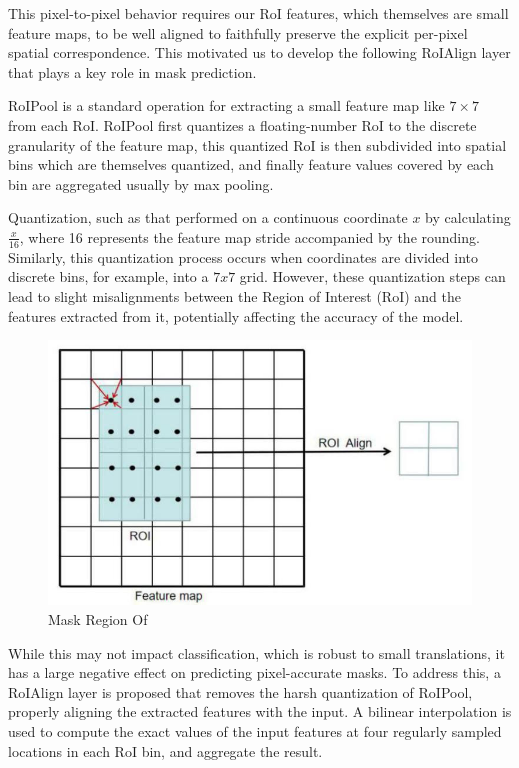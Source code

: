 This pixel-to-pixel behavior requires our RoI features, which themselves are small feature maps, to be well aligned to faithfully preserve the explicit 
per-pixel spatial correspondence. This motivated us to develop the following RoIAlign layer that plays a key role in mask prediction.

RoIPool is a standard operation for extracting a small feature map like \(7 \times 7\) from each RoI. RoIPool first quantizes a floating-number RoI to the 
discrete granularity of the feature map, this quantized RoI is then subdivided into spatial bins  which are themselves quantized, and finally feature 
values covered by each bin are aggregated usually by max pooling. 

Quantization, such as that performed on a continuous coordinate $x$ by calculating \(\frac{x}{16}\), where 16 represents the feature map stride accompanied
by the rounding. Similarly, this quantization process occurs when coordinates are divided into discrete bins, for example, into a $7x7$ grid. However, these 
quantization steps can lead to slight misalignments between the Region of Interest (RoI) and the features extracted from it, potentially affecting the accuracy 
of the model.

\begin{figure}[h!]
    \centering
    \includegraphics[scale=0.30]{Figures/mask-r-cnn-roi-align.png}
    \caption{Mask Region Of  \cite{mrcnn}}
    \label{fig:roi-align}
\end{figure}

While this may not impact classification, which is robust to small translations, it has a large negative effect on predicting pixel-accurate masks.
To address this, a RoIAlign layer is proposed that removes the harsh quantization of RoIPool, properly aligning the extracted features with the input. 
A bilinear interpolation is used to compute the exact values of the input features at four regularly sampled locations in each RoI bin, and aggregate 
the result.

